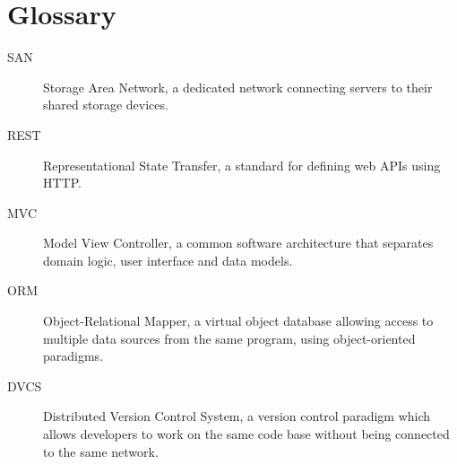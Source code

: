 \chapter*{Glossary}

\begin{description}
\item[SAN]
    Storage Area Network, a dedicated network connecting servers to their
    shared storage devices. \cite{ward2002}
\item[REST]
    Representational State Transfer, a standard for defining web APIs using
    HTTP.
\item[MVC]
    Model View Controller, a common software architecture that separates domain
    logic, user interface and data models.
\item[ORM]
    Object-Relational Mapper, a virtual object database allowing access to
    multiple data sources from the same program, using object-oriented
    paradigms.
\item[DVCS]
    Distributed Version Control System, a version control paradigm which allows
    developers to work on the same code base without being connected to the
    same network.
\end{description}
